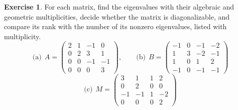 \documentclass[12pt]{article}
\theoremstyle{definition}
\newtheorem{exercise}{Exercise}
\begin{document}
\begin{exercise}\label{r7-dr-multiplicities}
For each matrix, find the eigenvalues with their algebraic and geometric multiplicities, decide whether the matrix is
diagonalizable, and compare its rank with the number of its nonzero eigenvalues, listed with multiplicity.
\[
\text{(a)}\ \ A=\begin{pmatrix}2&1&-1&0\\0&2&3&1\\0&0&-1&-1\\0&0&0&3\end{pmatrix},\qquad
\text{(b)}\ \ B=\begin{pmatrix}-1&0&-1&-2\\1&3&-2&-1\\1&0&1&2\\-1&0&-1&-1\end{pmatrix}
\]
\[
\text{(c)}\ \ M=\begin{pmatrix}3&1&1&2\\0&2&0&0\\-1&-1&1&-2\\0&0&0&2\end{pmatrix}
\]
\end{exercise}
\end{document}
